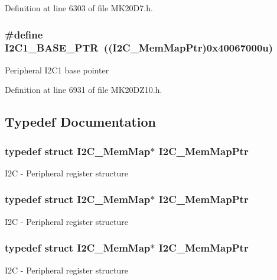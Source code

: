 Definition at line 6303 of file M\+K20\+D7.\+h.

\subsubsection[{\texorpdfstring{I2\+C1\+\_\+\+B\+A\+S\+E\+\_\+\+P\+TR}{I2C1_BASE_PTR}}]{\setlength{\rightskip}{0pt plus 5cm}\#define I2\+C1\+\_\+\+B\+A\+S\+E\+\_\+\+P\+TR~(({\bf I2\+C\+\_\+\+Mem\+Map\+Ptr})0x40067000u)}\hypertarget{group___i2_c___peripheral_gae13da5d584f2a4e2379db927a3f18772}{}\label{group___i2_c___peripheral_gae13da5d584f2a4e2379db927a3f18772}
Peripheral I2\+C1 base pointer 

Definition at line 6931 of file M\+K20\+D\+Z10.\+h.



\subsection{Typedef Documentation}
\subsubsection[{\texorpdfstring{I2\+C\+\_\+\+Mem\+Map\+Ptr}{I2C_MemMapPtr}}]{\setlength{\rightskip}{0pt plus 5cm}typedef struct {\bf I2\+C\+\_\+\+Mem\+Map}$\ast$ {\bf I2\+C\+\_\+\+Mem\+Map\+Ptr}}\hypertarget{group___i2_c___peripheral_ga9902bc02a12982d0c37ec011b4dd89f0}{}\label{group___i2_c___peripheral_ga9902bc02a12982d0c37ec011b4dd89f0}
I2C -\/ Peripheral register structure 
\subsubsection[{\texorpdfstring{I2\+C\+\_\+\+Mem\+Map\+Ptr}{I2C_MemMapPtr}}]{\setlength{\rightskip}{0pt plus 5cm}typedef struct {\bf I2\+C\+\_\+\+Mem\+Map}$\ast$ {\bf I2\+C\+\_\+\+Mem\+Map\+Ptr}}\hypertarget{group___i2_c___peripheral_ga9902bc02a12982d0c37ec011b4dd89f0}{}\label{group___i2_c___peripheral_ga9902bc02a12982d0c37ec011b4dd89f0}
I2C -\/ Peripheral register structure 
\subsubsection[{\texorpdfstring{I2\+C\+\_\+\+Mem\+Map\+Ptr}{I2C_MemMapPtr}}]{\setlength{\rightskip}{0pt plus 5cm}typedef struct {\bf I2\+C\+\_\+\+Mem\+Map}$\ast$ {\bf I2\+C\+\_\+\+Mem\+Map\+Ptr}}\hypertarget{group___i2_c___peripheral_ga9902bc02a12982d0c37ec011b4dd89f0}{}\label{group___i2_c___peripheral_ga9902bc02a12982d0c37ec011b4dd89f0}
I2C -\/ Peripheral register structure 